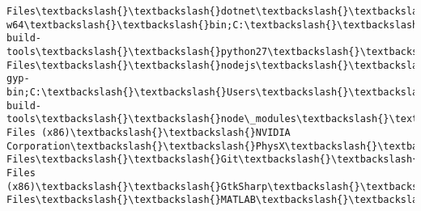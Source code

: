 \documentclass[11pt]{article}
\begin{document}
\begin{Verbatim}[commandchars=\\\{\}]
Files\textbackslash{}\textbackslash{}dotnet\textbackslash{}\textbackslash{};C:\textbackslash{}\textbackslash{}Users\textbackslash{}\textbackslash{}xuhao\textbackslash{}\textbackslash{}Anaconda3;C:\textbackslash{}\textbackslash{}Users\textbackslash{}\textbackslash{}xuhao\textbackslash{}\textbackslash{}Anaconda3\textbackslash{}\textbackslash{}Library\textbackslash{}\textbackslash{}mingw-w64\textbackslash{}\textbackslash{}bin;C:\textbackslash{}\textbackslash{}Users\textbackslash{}\textbackslash{}xuhao\textbackslash{}\textbackslash{}Anaconda3\textbackslash{}\textbackslash{}Library\textbackslash{}\textbackslash{}usr\textbackslash{}\textbackslash{}bin;C:\textbackslash{}\textbackslash{}Users\textbackslash{}\textbackslash{}xuhao\textbackslash{}\textbackslash{}Anaconda3\textbackslash{}\textbackslash{}Library\textbackslash{}\textbackslash{}bin;C:\textbackslash{}\textbackslash{}Users\textbackslash{}\textbackslash{}xuhao\textbackslash{}\textbackslash{}Anaconda3\textbackslash{}\textbackslash{}Scripts;C:\textbackslash{}\textbackslash{}Users\textbackslash{}\textbackslash{}xuhao\textbackslash{}\textbackslash{}.windows-build-tools\textbackslash{}\textbackslash{}python27\textbackslash{}\textbackslash{};C:\textbackslash{}\textbackslash{}Program Files\textbackslash{}\textbackslash{}nodejs\textbackslash{}\textbackslash{}node\_modules\textbackslash{}\textbackslash{}npm\textbackslash{}\textbackslash{}bin\textbackslash{}\textbackslash{}node-gyp-bin;C:\textbackslash{}\textbackslash{}Users\textbackslash{}\textbackslash{}xuhao\textbackslash{}\textbackslash{}AppData\textbackslash{}\textbackslash{}Roaming\textbackslash{}\textbackslash{}npm\textbackslash{}\textbackslash{}node\_modules\textbackslash{}\textbackslash{}windows-build-tools\textbackslash{}\textbackslash{}node\_modules\textbackslash{}\textbackslash{}.bin;C:\textbackslash{}\textbackslash{}Users\textbackslash{}\textbackslash{}xuhao\textbackslash{}\textbackslash{}AppData\textbackslash{}\textbackslash{}Roaming\textbackslash{}\textbackslash{}npm\textbackslash{}\textbackslash{}node\_modules\textbackslash{}\textbackslash{}.bin;C:\textbackslash{}\textbackslash{}Windows\textbackslash{}\textbackslash{}system32;C:\textbackslash{}\textbackslash{}Windows;C:\textbackslash{}\textbackslash{}Windows\textbackslash{}\textbackslash{}System32\textbackslash{}\textbackslash{}Wbem;C:\textbackslash{}\textbackslash{}Windows\textbackslash{}\textbackslash{}System32\textbackslash{}\textbackslash{}WindowsPowerShell\textbackslash{}\textbackslash{}v1.0\textbackslash{}\textbackslash{};C:\textbackslash{}\textbackslash{}Program Files (x86)\textbackslash{}\textbackslash{}NVIDIA Corporation\textbackslash{}\textbackslash{}PhysX\textbackslash{}\textbackslash{}Common;C:\textbackslash{}\textbackslash{}Program Files\textbackslash{}\textbackslash{}Git\textbackslash{}\textbackslash{}cmd;C:\textbackslash{}\textbackslash{}Program Files (x86)\textbackslash{}\textbackslash{}GtkSharp\textbackslash{}\textbackslash{}2.12\textbackslash{}\textbackslash{}bin;C:\textbackslash{}\textbackslash{}Program Files\textbackslash{}\textbackslash{}MATLAB\textbackslash{}\textbackslash{}R2016b\textbackslash{}\textbackslash{}runtime\textbackslash{}\textbackslash{}win64;C:\textbackslash{}\textbackslash{}Program 
\end{Verbatim}
\end{document}
